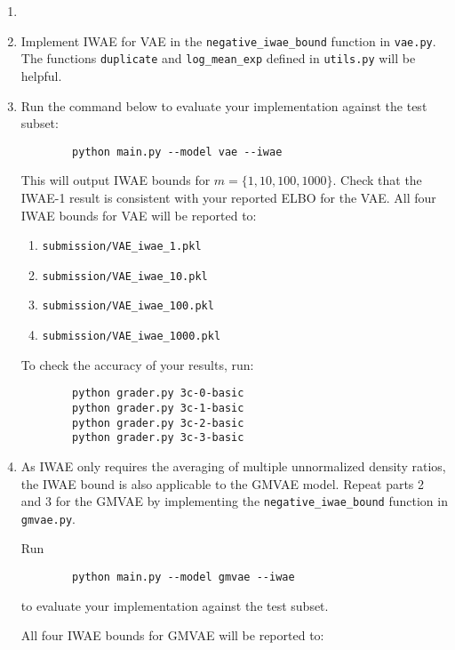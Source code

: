 \begin{enumerate}[label=(\alph*)]
    \item 

    \item {} Implement IWAE for VAE in the \texttt{negative\_iwae\_bound} function in \texttt{vae.py}. The functions \texttt{duplicate}
    and \texttt{log\_mean\_exp} defined in \texttt{utils.py} will be helpful.

    \item {} Run the command below to evaluate your implementation against the test subset:
    \begin{verbatim}
        python main.py --model vae --iwae
    \end{verbatim}

    This will output IWAE bounds for $m = \{1,10,100,1000\}$. Check that the IWAE-1 result is consistent with 
    your reported ELBO for the VAE. All four IWAE bounds for VAE will be reported to:
    \begin{enumerate}
        \item \texttt{submission/VAE\_iwae\_1.pkl}
        \item \texttt{submission/VAE\_iwae\_10.pkl}
        \item \texttt{submission/VAE\_iwae\_100.pkl}
        \item \texttt{submission/VAE\_iwae\_1000.pkl}
    \end{enumerate}

    To check the accuracy of your results, run:
    \begin{verbatim}
        python grader.py 3c-0-basic
        python grader.py 3c-1-basic
        python grader.py 3c-2-basic
        python grader.py 3c-3-basic
    \end{verbatim}

    \item {} As IWAE only requires the averaging of multiple unnormalized density ratios, the IWAE bound is also applicable 
    to the GMVAE model. Repeat parts 2 and 3 for the GMVAE by implementing the \texttt{negative\_iwae\_bound} function in 
    \texttt{gmvae.py}. 
    
    Run 
    \begin{verbatim}
        python main.py --model gmvae --iwae
    \end{verbatim}
   to evaluate your implementation against the test subset. 
   
   All four IWAE bounds for GMVAE will be reported to:


\end{enumerate}
